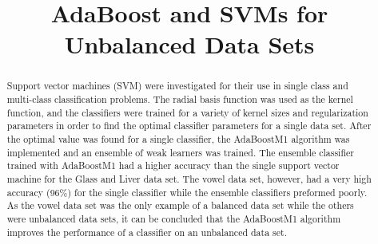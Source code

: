 \documentclass[confrence]{IEEEtran}
\begin{document}
\title{AdaBoost and SVMs for Unbalanced Data Sets}

\author{
}

\maketitle

\begin{abstract}
Support vector machines (SVM) were investigated for their use in single class and multi-class classification problems.
The radial basis function was used as the kernel function, and the classifiers were trained for a variety of kernel sizes and regularization parameters in order to find the optimal classifier parameters for a single data set.
After the optimal value was found for a single classifier, the AdaBoostM1 algorithm was implemented and an ensemble of weak learners was trained.
The ensemble classifier trained with AdaBoostM1 had a higher accuracy than the single support vector machine for the Glass and Liver data set.
The vowel data set, however, had a very high accuracy (96\%) for the single classifier while the ensemble classifiers preformed poorly.
As the vowel data set was the only example of a balanced data set while the others were unbalanced data sets, it can be concluded that the AdaBoostM1 algorithm improves the performance of a classifier on an unbalanced data set.
\end{abstract}

\IEEEpeerreviewmaketitle








\end{document}
